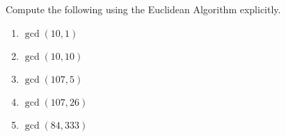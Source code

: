   Compute the following using the Euclidean Algorithm explicitly.
  \begin{enumerate}[nosep,label=\textnormal{(\alph*)}]
  \item $\gcd(10, 1)$
  \item $\gcd(10, 10)$
  \item $\gcd(107, 5)$
  \item $\gcd(107, 26)$
  \item $\gcd(84, 333)$
  \end{enumerate}
